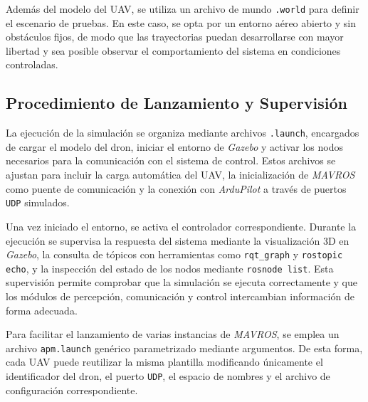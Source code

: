 Además del modelo del UAV, se utiliza un archivo de mundo \texttt{.world} para definir el escenario de pruebas. En este caso, se opta por un entorno aéreo abierto y sin obstáculos fijos, de modo que las trayectorias puedan desarrollarse con mayor libertad y sea posible observar el comportamiento del sistema en condiciones controladas.

\subsection{Procedimiento de Lanzamiento y Supervisión}
La ejecución de la simulación se organiza mediante archivos \texttt{.launch}, encargados de cargar el modelo del dron, iniciar el entorno de \textit{Gazebo} y activar los nodos necesarios para la comunicación con el sistema de control. Estos archivos se ajustan para incluir la carga automática del UAV, la inicialización de \textit{MAVROS} como puente de comunicación y la conexión con \textit{ArduPilot} a través de puertos \texttt{UDP} simulados.

Una vez iniciado el entorno, se activa el controlador correspondiente. Durante la ejecución se supervisa la respuesta del sistema mediante la visualización 3D en \textit{Gazebo}, la consulta de tópicos con herramientas como \texttt{rqt\_graph} y \texttt{rostopic echo}, y la inspección del estado de los nodos mediante \texttt{rosnode list}. Esta supervisión permite comprobar que la simulación se ejecuta correctamente y que los módulos de percepción, comunicación y control intercambian información de forma adecuada.

\vspace{0.3cm}

Para facilitar el lanzamiento de varias instancias de \textit{MAVROS}, se emplea un archivo \texttt{apm.launch} genérico parametrizado mediante argumentos. De esta forma, cada UAV puede reutilizar la misma plantilla modificando únicamente el identificador del dron, el puerto \texttt{UDP}, el espacio de nombres y el archivo de configuración correspondiente.

